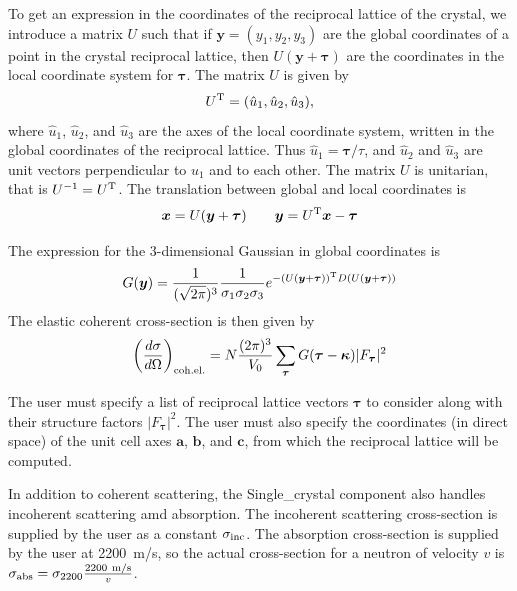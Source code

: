 To get an expression in the coordinates of the reciprocal lattice of the
crystal, we introduce a matrix $U$ such that if $\boldsymbol{y} =
(y_1,y_2,y_3)$ are the global coordinates of a point in the crystal
reciprocal lattice, then $U(\boldsymbol{y} + \boldsymbol{\tau})$ are the
coordinates in the local coordinate system for $\boldsymbol{\tau}$. The
matrix $U$ is given by
$$ U^{\rm T} = (\hat{u}_1, \hat{u}_2, \hat{u}_3), $$
where $\hat{u}_1$, $\hat{u}_2$, and $\hat{u}_3$ are the axes of the
local coordinate system, written in the global coordinates of the
reciprocal lattice. Thus
$\hat{u}_1 = \boldsymbol{\tau}/\tau$,  and $\hat{u}_2$ and $\hat{u}_3$ are
unit vectors perpendicular to $\hat{u}_1$ and to each other.
The matrix $U$ is unitarian, that is
$U^{-1} = U^{\rm T}$. The translation between global and local
coordinates is
$$ \boldsymbol{x} = U(\boldsymbol{y} + \boldsymbol{\tau}) \qquad
   \boldsymbol{y} = U^{\rm T} \boldsymbol{x} - \boldsymbol{\tau} $$

The expression for the 3-dimensional Gaussian in global coordinates is
\begin{equation}
  G(\boldsymbol{y}) =
  \frac{1}{(\sqrt{2\pi})^3}\frac{1}{\sigma_1\sigma_2\sigma_3}
  e^{-(U(\boldsymbol{y}+\boldsymbol{\tau}))^{\rm T} D (U(\boldsymbol{y}+\boldsymbol{\tau}))}
\end{equation}
The elastic coherent cross-section is then given by
\begin{equation}
  \label{eq:crystal-cross-section}
  \left(\frac{d\sigma}{d\Omega}\right)_{\rm coh.el.} =
        N\frac{(2\pi)^3}{V_0}\sum_{\boldsymbol{\tau}}
        G(\boldsymbol{\tau} - \boldsymbol{\kappa})
         |F_{\boldsymbol{\tau}}|^2
\end{equation}

The user must specify a list of reciprocal lattice vectors
$\boldsymbol{\tau}$ to consider along with their structure factors
$|F_{\boldsymbol{\tau}}|^2$. The user must also specify the coordinates
(in direct space) of the unit cell axes $\boldsymbol{a}$,
$\boldsymbol{b}$, and $\boldsymbol{c}$, from which the reciprocal lattice
will be computed.

In addition to coherent scattering, the Single\_crystal component also
handles incoherent scattering amd absorption. The incoherent scattering
cross-section is supplied by the user as a constant $\sigma_{\rm
  inc}$. The absorption cross-section is supplied by the user at
2200~m/s, so the actual cross-section for a neutron of velocity $v$ is
$\sigma_{\rm abs} = \sigma_{2200} \frac{\rm 2200~m/s}{v}$.

